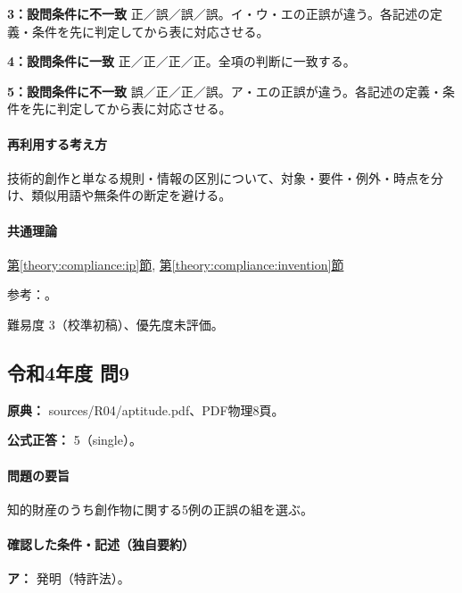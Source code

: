 \noindent\textbf{3：設問条件に不一致} 正／誤／誤／誤。イ・ウ・エの正誤が違う。各記述の定義・条件を先に判定してから表に対応させる。\par

\noindent\textbf{4：設問条件に一致} 正／正／正／正。全項の判断に一致する。\par

\noindent\textbf{5：設問条件に不一致} 誤／正／正／誤。ア・エの正誤が違う。各記述の定義・条件を先に判定してから表に対応させる。\par

\paragraph{再利用する考え方} 技術的創作と単なる規則・情報の区別について、対象・要件・例外・時点を分け、類似用語や無条件の断定を避ける。

\paragraph{共通理論} \hyperref[theory:compliance:ip]{第\ref*{theory:compliance:ip}節}, \hyperref[theory:compliance:invention]{第\ref*{theory:compliance:invention}節}

\par 参考：\cite{ip_basic_act,jpo_patent_utility,jpo_invention_criteria}。

\par 難易度 3（校準初稿）、優先度未評価。

\subsection{令和4年度 問9}
\label{q:r04-reg-apt-09}

\noindent\textbf{原典：} sources/R04/aptitude.pdf、PDF物理8頁。

\textbf{公式正答：} 5（single）。

\paragraph{問題の要旨} 知的財産のうち創作物に関する5例の正誤の組を選ぶ。

\paragraph{確認した条件・記述（独自要約）}\mbox{}\par

\noindent\textbf{ア：} 発明（特許法）。\par

